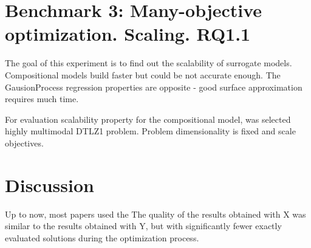 \section{Benchmark 3: Many-objective optimization. Scaling. RQ1.1}

    The goal of this experiment is to find out the scalability of surrogate models. Compositional models build faster but could be not accurate enough. The GausionProcess regression properties are opposite - good surface approximation requires much time. 

    For evaluation scalability property for the compositional model, was selected highly multimodal DTLZ1 problem. Problem dimensionality is fixed and scale objectives.













\section{Discussion}

Up to now, most papers used the
The quality of the results obtained with X was similar to the results obtained with Y, but with significantly fewer exactly evaluated solutions during the optimization process. 


